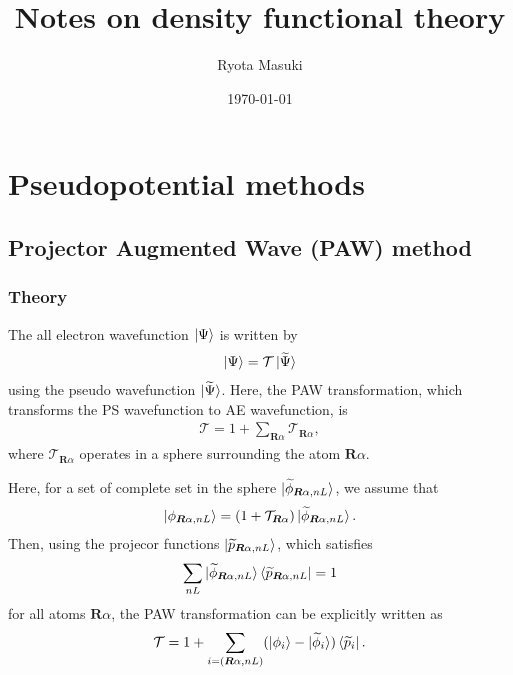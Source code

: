 \documentclass{article}
\title{Notes on density functional theory}
\author{Ryota Masuki}
\date{\today}
\begin{document}
\maketitle

\section{Pseudopotential methods}
\subsection{Projector Augmented Wave (PAW) method}
\subsubsection{Theory}
The all electron wavefunction $\ket{\Psi}$ is written by 
\begin{align}
\ket{\Psi} = \mathcal{T} \ket{\widetilde{\Psi}}
\end{align}
using the pseudo wavefunction $\ket{\widetilde{\Psi}}$. Here, the PAW transformation, which transforms the PS wavefunction to AE wavefunction, is 
\begin{align}
  \mathcal{T} = 1 + \sum_{\bm{R}\alpha} \mathcal{T}_{\bm{R}\alpha},
\end{align}
where $\mathcal{T}_{\bm{R}\alpha}$ operates in a sphere surrounding the atom $\bm{R}\alpha$.

Here, for a set of complete set in the sphere $\ket{\widetilde{\phi}_{\bm{R}\alpha, nL}}$, we assume that 
\begin{align}
  \ket{{\phi}_{\bm{R}\alpha, nL}} = (1 + \mathcal{T}_{\bm{R}\alpha}) \ket{\widetilde{\phi}_{\bm{R}\alpha, nL}}.
\end{align}
Then, using the projecor functions $\ket{\widetilde{p}_{\bm{R}\alpha,nL}}$, which satisfies
\begin{align} 
  \sum_{nL} \ket{\widetilde{\phi}_{\bm{R}\alpha, nL}} \bra{\widetilde{p}_{\bm{R}\alpha, nL}} = 1
\end{align}
for all atoms $\bm{R}\alpha$, the PAW transformation can be explicitly written as 
\begin{align}
  \mathcal{T} = 1 + \sum_{i = (\bm{R}\alpha, nL)} (\ket{\phi_i} - \ket{\widetilde{\phi}_i}) \bra{\widetilde{p}_i}.
\end{align}
\end{document}
